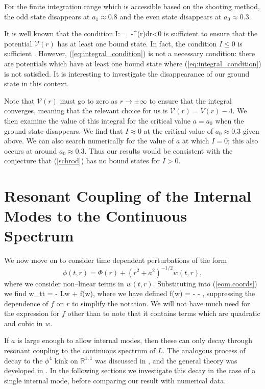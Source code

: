 For the finite integration range which is accessible based on the shooting method, the odd state disappears at $a_1 \approx 0.8$ and the even state disappears at $a_0 \approx 0.3$.

It is well known that the condition
\be
\label{eq:integral_condition}
I:=\int_{-\infty}^{\infty}(r)dr<0
\ee
is sufficient to ensure that the potential $\mathcal{V}(r)$ has at least one bound state. In fact, the condition $I\leq 0$ is sufficient \cite{BarrySimon}. However, (\ref{eq:integral_condition}) is not a necessary condition: there are potentials which have at least one bound state where (\ref{eq:integral_condition}) is not satisfied. It is interesting to investigate the disappearance of our ground state in this context.

Note that $\mathcal{V}(r)$ must go to zero as $r\rightarrow\pm\infty$ to ensure that the integral converges, meaning that the relevant choice for us is $\mathcal{V}(r)=V(r)-4$. We then examine the value of this integral for the critical value $a=a_0$ when the ground state disappears. We find that $I\approx0$ at the critical value of $a_0 \approx 0.3$ given above. We can also search numerically for the value of $a$ at which $I=0$; this also occurs at around $a_0 \approx 0.3$. Thus our results would be consistent with the conjecture that (\ref{schrod}) has no bound states for $I>0$.

\section{Resonant Coupling of the Internal Modes to the Continuous Spectrum} \label{sec:dynamics}
We now move on to consider time dependent perturbations of the form
\[
\phi(t,r) = \Phi(r) + (r^2+a^2)^{-1/2}w(t,r),
\]
where we consider non--linear terms in $w(t,r)$. Substituting into (\ref{eom.coords}) we find
\be
\label{eq:nonsmall_pert}
w_{tt} = - Lw + f(w),
\ee
where we have defined
\be \label{eq:f}
f(w) = -  - ,
\ee
suppressing the dependence of $f$ on $r$ to simplify the notation. We will not have much need for the expression for $f$ other than to note that it contains terms which are quadratic and cubic in $w$.

If $a$ is large enough to allow internal modes, then these can only decay through resonant coupling to the continuous spectrum of $L$. The analogous process of decay to the $\phi^4$ kink on $\mathbb{R}^{1,1}$ was discussed in \cite{Manton&Merabet}, and the general theory was developed in \cite{SW98}. In the following sections we investigate this decay in the case of a single internal mode, before comparing our result with numerical data.

